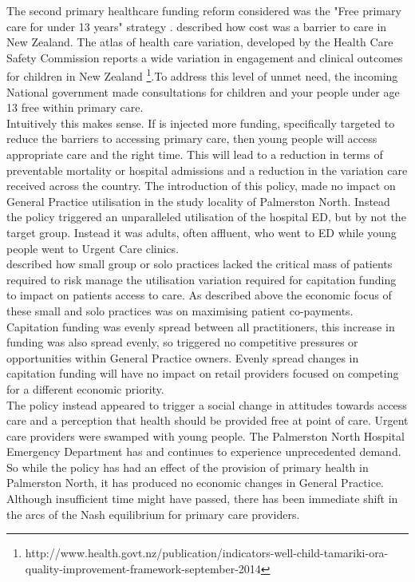 \documentclass[11pt,a4paper]{article}
\begin{document}
The second primary healthcare funding reform considered was the "Free primary care for under 13 years" strategy \citep{frizelle2014health}. \citet{schoen2009survey} described how cost was a barrier to care in New Zealand. The atlas of health care variation, developed by the Health Care Safety Commission reports a wide variation in engagement and clinical outcomes for children in New Zealand \footnote{http://www.health.govt.nz/publication/indicators-well-child-tamariki-ora-quality-improvement-framework-september-2014}.To address this level of unmet need, the incoming National government made consultations for children and your people under age 13 free within primary care\citep{frizelle2014health}. \\

Intuitively this makes sense. If is injected more funding, specifically targeted to reduce the barriers to accessing primary care, then young people will access appropriate care and the right time. This will lead to a reduction in terms of preventable mortality or hospital admissions and a reduction in the variation care received across the country. The introduction of this policy, made no impact on General Practice utilisation in the study locality of Palmerston North. Instead the policy triggered an unparalleled utilisation of the hospital ED, but by not the target group. Instead it was adults, often affluent, who went to ED while young people went to Urgent Care clinics.\\

\citet{howell2005restructuring} described how small group or solo practices lacked the critical mass of patients required to risk manage the utilisation variation required for capitation funding to impact on patients access to care. As described above the economic focus of these small and solo practices was on maximising patient co-payments. Capitation funding was evenly spread between all practitioners, this increase in funding was also spread evenly, so triggered no competitive pressures or opportunities within General Practice owners. Evenly spread changes in capitation funding will have no impact on retail providers focused on competing for a different economic priority.\\

The policy instead appeared to trigger a social change in attitudes towards access care and a perception that health should be provided free at point of care. Urgent care providers were swamped with young people. The Palmerston North Hospital Emergency Department has and continues to experience unprecedented demand. So while the policy has had an effect of the provision of primary health in Palmerston North, it has produced no economic changes in General Practice. Although insufficient time might have passed, there has been immediate shift in the arcs of the Nash equilibrium for primary care providers.\\
\end{document}
